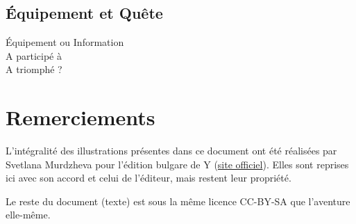 \documentclass{report}
\begin{document}
\section{Équipement et Quête}

\begin{framed}
\begin{Form}
\begin{description}
    \item[Équipement ou Information] \mytextfield{8cm}
    \item[A participé à] \mytextfield{8cm}
    \item[A triomphé ?] \mycheckbox
\end{description}
\end{Form}
\end{framed}

\chapter{Remerciements}

L'intégralité des illustrations présentes dans ce document ont été réalisées par Svetlana Murdzheva pour l'édition bulgare de Y (\href{http://knigi-igri.bg/}{site officiel}). Elles sont reprises ici avec son accord et celui de l'éditeur, mais restent leur propriété.

Le reste du document (texte) est sous la même licence CC-BY-SA que l'aventure elle-même.
\end{document}
